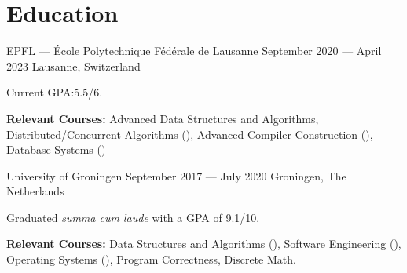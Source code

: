 \section*{Education}

\begin{cventries}
{EPFL --- École Polytechnique Fédérale de Lausanne} %
{September 2020 --- April 2023} %
{Lausanne, Switzerland} %
{%
  \begin{cvitems}
    \item Current GPA:\@ 5.5/6.
    \item \textbf{Relevant Courses:} Advanced Data Structures and Algorithms, Distributed/Concurrent Algorithms (), Advanced Compiler Construction (), Database Systems ()
  \end{cvitems}
}
{University of Groningen}  %
{September 2017 --- July 2020} %
{Groningen, The Netherlands} %
{%
  \begin{cvitems}
    \item Graduated \textit{summa cum laude} with a GPA of 9.1/10.
    \item \textbf{Relevant Courses:} Data Structures and Algorithms (), Software Engineering (), Operating Systems (), Program Correctness,  Discrete Math.
  \end{cvitems}
}
\end{cventries}
